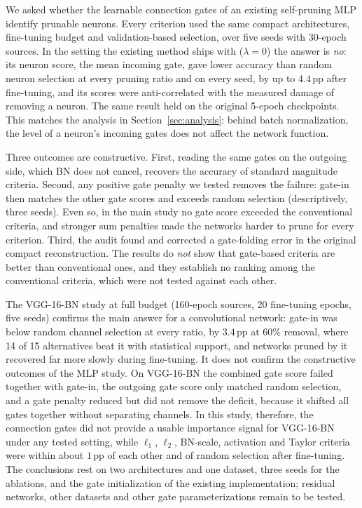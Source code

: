 We asked whether the learnable connection gates of an existing self-pruning MLP identify
prunable neurons. Every criterion used the same compact architectures, fine-tuning budget
and validation-based selection, over five seeds with 30-epoch sources. In the setting the
existing method ships with ($\lambda=0$) the answer is \emph{no}: its neuron score, the
mean incoming gate, gave lower accuracy than random neuron selection at every pruning ratio
and on every seed, by up to $4.4$\,pp after fine-tuning, and its scores were
anti-correlated with the measured damage of removing a neuron. The same result held on the
original 5-epoch checkpoints. This matches the analysis in Section~\ref{sec:analysis}:
behind batch normalization, the level of a neuron's incoming gates does not affect the
network function.

Three outcomes are constructive. First, reading the same gates on the outgoing side, which
BN does not cancel, recovers the accuracy of standard magnitude criteria. Second, any
positive gate penalty we tested removes the failure: gate-in then matches the other gate
scores and exceeds random selection (descriptively, three seeds). Even so, in the main study no gate score exceeded the conventional
criteria, and stronger sum penalties made the networks harder to prune for every
criterion. Third, the audit found and corrected a gate-folding error in the original
compact reconstruction. The results do \emph{not} show that gate-based criteria are better
than conventional ones, and they establish no ranking among the conventional criteria,
which were not tested against each other.

The VGG-16-BN study at full budget (160-epoch sources, 20 fine-tuning epochs, five
seeds) confirms the main answer for a convolutional network: gate-in was below random
channel selection at every ratio, by $3.4$\,pp at $60\%$ removal, where 14 of 15
alternatives beat it with statistical support, and networks pruned by it recovered far
more slowly during fine-tuning. It does not confirm the constructive outcomes of the MLP
study. On VGG-16-BN the combined gate score failed together with gate-in, the outgoing
gate score only matched random selection, and a gate penalty reduced but did not remove
the deficit, because it shifted all gates together without separating channels. In this
study, therefore, the connection gates did not provide a usable importance signal for
VGG-16-BN under any tested setting, while $\ell_1$, $\ell_2$, BN-scale, activation and
Taylor criteria were within about $1$\,pp of each other and of random selection after
fine-tuning. The conclusions rest on two architectures and one dataset, three seeds for
the ablations, and the gate initialization of the existing implementation; residual
networks, other datasets and other gate parameterizations remain to be tested.
